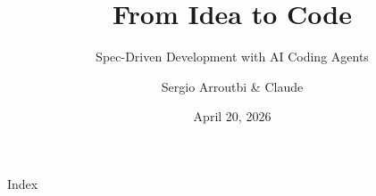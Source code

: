 \documentclass{beamer}
\title{From Idea to Code}
\subtitle{Spec-Driven Development with AI Coding Agents}
\author{Sergio Arroutbi \& Claude}
\institute[]{Security Special Projects}
\date{April 20, 2026}
\begin{document}
\begin{frame}
  \titlepage
\end{frame}

\begin{frame}{Index}
  \tiny
  \tableofcontents
\end{frame}














\end{document}
